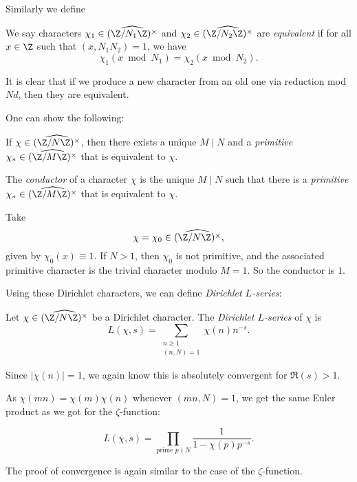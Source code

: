 \documentclass[a4paper]{article}
\begin{document}
Similarly we define
\begin{defi}
  We say characters $\chi_1 \in \widehat{(\Z/N_1\Z)^\times}$ and $\chi_2 \in \widehat{(\Z/N_2\Z)^\times}$ are \emph{equivalent} if for all $x \in \Z$ such that $(x, N_1 N_2) = 1$, we have
  \[
    \chi_1(x \bmod N_1) = \chi_2(x \bmod N_2).
  \]
\end{defi}
It is clear that if we produce a new character from an old one via reduction mod $Nd$, then they are equivalent.

One can show the following:
\begin{prop}
  If $\chi \in \widehat{(\Z/N\Z)^\times}$, then there exists a unique $M \mid N$ and a \emph{primitive} $\chi_* \in \widehat{(\Z/M\Z)^\times}$ that is equivalent to $\chi$.
\end{prop}

\begin{defi}[Conductor]
  The \emph{conductor} of a character $\chi$ is the unique $M \mid N$ such that there is a \emph{primitive} $\chi_* \in \widehat{(\Z/M\Z)^\times}$ that is equivalent to $\chi$.
\end{defi}

\begin{eg}
  Take
  \[
    \chi = \chi_0 \in \widehat{(\Z/N\Z)^\times},
  \]
  given by $\chi_0(x) \equiv 1$. If $N > 1$, then $\chi_0$ is not primitive, and the associated primitive character is the trivial character modulo $M = 1$. So the conductor is $1$.
\end{eg}

Using these Dirichlet characters, we can define \emph{Dirichlet $L$-series}:

\begin{defi}
  Let $\chi \in \widehat{(\Z/N\Z)^\times}$ be a Dirichlet character. The \emph{Dirichlet $L$-series} of $\chi$ is
  \[
    L(\chi, s) = \sum_{\substack{n \geq 1\\(n, N) = 1}} \chi(n) n^{-s}.
  \]
\end{defi}
Since $|\chi(n)| = 1$, we again know this is absolutely convergent for $\Re(s) > 1$.

As $\chi(mn) = \chi(m)\chi(n)$ whenever $(mn, N) = 1$, we get the same Euler product as we got for the $\zeta$-function:
\begin{prop}
  \[
    L(\chi, s) = \prod_{\text{prime }p \nmid N} \frac{1}{1 - \chi(p) p^{-s}}.
  \]
\end{prop}
The proof of convergence is again similar to the case of the $\zeta$-function.
\end{document}
